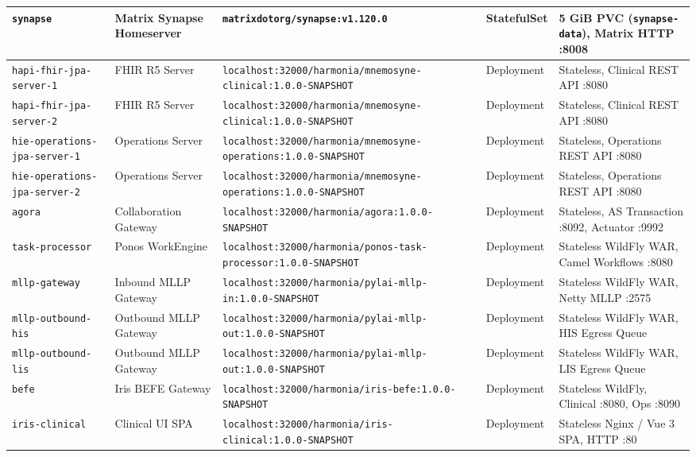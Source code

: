 \begin{table}[htbp]
\begin{tabularx}{\textwidth}{P{3.4cm} P{3.5cm} P{4.2cm} l Y}
\midrule
\nolinkurl{synapse} & Matrix Synapse Homeserver & \nolinkurl{matrixdotorg/synapse:v1.120.0} & StatefulSet & 5 GiB PVC (\nolinkurl{synapse-data}), Matrix HTTP :8008 \\
\midrule
\nolinkurl{hapi-fhir-jpa-server-1} & FHIR R5 Server & \nolinkurl{localhost:32000/harmonia/mnemosyne-clinical:1.0.0-SNAPSHOT} & Deployment & Stateless, Clinical REST API :8080 \\
\nolinkurl{hapi-fhir-jpa-server-2} & FHIR R5 Server & \nolinkurl{localhost:32000/harmonia/mnemosyne-clinical:1.0.0-SNAPSHOT} & Deployment & Stateless, Clinical REST API :8080 \\
\nolinkurl{hie-operations-jpa-server-1} & Operations Server & \nolinkurl{localhost:32000/harmonia/mnemosyne-operations:1.0.0-SNAPSHOT} & Deployment & Stateless, Operations REST API :8080 \\
\nolinkurl{hie-operations-jpa-server-2} & Operations Server & \nolinkurl{localhost:32000/harmonia/mnemosyne-operations:1.0.0-SNAPSHOT} & Deployment & Stateless, Operations REST API :8080 \\
\midrule
\nolinkurl{agora} & Collaboration Gateway & \nolinkurl{localhost:32000/harmonia/agora:1.0.0-SNAPSHOT} & Deployment & Stateless, AS Transaction :8092, Actuator :9992 \\
\nolinkurl{task-processor} & Ponos WorkEngine & \nolinkurl{localhost:32000/harmonia/ponos-task-processor:1.0.0-SNAPSHOT} & Deployment & Stateless WildFly WAR, Camel Workflows :8080 \\
\nolinkurl{mllp-gateway} & Inbound MLLP Gateway & \nolinkurl{localhost:32000/harmonia/pylai-mllp-in:1.0.0-SNAPSHOT} & Deployment & Stateless WildFly WAR, Netty MLLP :2575 \\
\nolinkurl{mllp-outbound-his} & Outbound MLLP Gateway & \nolinkurl{localhost:32000/harmonia/pylai-mllp-out:1.0.0-SNAPSHOT} & Deployment & Stateless WildFly WAR, HIS Egress Queue \\
\nolinkurl{mllp-outbound-lis} & Outbound MLLP Gateway & \nolinkurl{localhost:32000/harmonia/pylai-mllp-out:1.0.0-SNAPSHOT} & Deployment & Stateless WildFly WAR, LIS Egress Queue \\
\midrule
\nolinkurl{befe} & Iris BEFE Gateway & \nolinkurl{localhost:32000/harmonia/iris-befe:1.0.0-SNAPSHOT} & Deployment & Stateless WildFly, Clinical :8080, Ops :8090 \\
\nolinkurl{iris-clinical} & Clinical UI SPA & \nolinkurl{localhost:32000/harmonia/iris-clinical:1.0.0-SNAPSHOT} & Deployment & Stateless Nginx / Vue 3 SPA, HTTP :80 \\

\end{tabularx}
\end{table}
